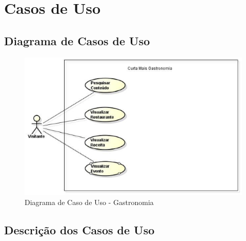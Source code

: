 \chapter[Casos de Uso]{Casos de Uso}

\section{Diagrama de Casos de Uso}

\begin{figure}[h!]
	\begin{center}
		\includegraphics[keepaspectratio,scale=0.6]{figuras/diagrama.eps}
		\caption{Diagrama de Caso de Uso - Gastronomia}
	\end{center}
\end{figure}

\section{Descrição dos Casos de Uso}

